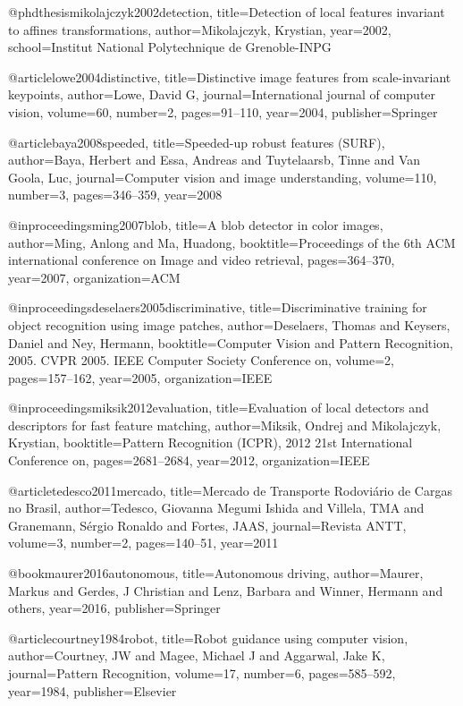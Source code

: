 @phdthesis{mikolajczyk2002detection,
  title={Detection of local features invariant to affines transformations},
  author={Mikolajczyk, Krystian},
  year={2002},
  school={Institut National Polytechnique de Grenoble-INPG}
}

@article{lowe2004distinctive,
  title={Distinctive image features from scale-invariant keypoints},
  author={Lowe, David G},
  journal={International journal of computer vision},
  volume={60},
  number={2},
  pages={91--110},
  year={2004},
  publisher={Springer}
}

@article{baya2008speeded,
  title={Speeded-up robust features (SURF)},
  author={Baya, Herbert and Essa, Andreas and Tuytelaarsb, Tinne and Van Goola, Luc},
  journal={Computer vision and image understanding},
  volume={110},
  number={3},
  pages={346--359},
  year={2008}
}

@inproceedings{ming2007blob,
  title={A blob detector in color images},
  author={Ming, Anlong and Ma, Huadong},
  booktitle={Proceedings of the 6th ACM international conference on Image and video retrieval},
  pages={364--370},
  year={2007},
  organization={ACM}
}

@inproceedings{deselaers2005discriminative,
  title={Discriminative training for object recognition using image patches},
  author={Deselaers, Thomas and Keysers, Daniel and Ney, Hermann},
  booktitle={Computer Vision and Pattern Recognition, 2005. CVPR 2005. IEEE Computer Society Conference on},
  volume={2},
  pages={157--162},
  year={2005},
  organization={IEEE}
}

@inproceedings{miksik2012evaluation,
  title={Evaluation of local detectors and descriptors for fast feature matching},
  author={Miksik, Ondrej and Mikolajczyk, Krystian},
  booktitle={Pattern Recognition (ICPR), 2012 21st International Conference on},
  pages={2681--2684},
  year={2012},
  organization={IEEE}
}

@article{tedesco2011mercado,
  title={Mercado de Transporte Rodovi{\'a}rio de Cargas no Brasil},
  author={Tedesco, Giovanna Megumi Ishida and Villela, TMA and Granemann, S{\'e}rgio Ronaldo and Fortes, JAAS},
  journal={Revista ANTT},
  volume={3},
  number={2},
  pages={140--51},
  year={2011}
}

@book{maurer2016autonomous,
  title={Autonomous driving},
  author={Maurer, Markus and Gerdes, J Christian and Lenz, Barbara and Winner, Hermann and others},
  year={2016},
  publisher={Springer}
}

@article{courtney1984robot,
  title={Robot guidance using computer vision},
  author={Courtney, JW and Magee, Michael J and Aggarwal, Jake K},
  journal={Pattern Recognition},
  volume={17},
  number={6},
  pages={585--592},
  year={1984},
  publisher={Elsevier}
}

